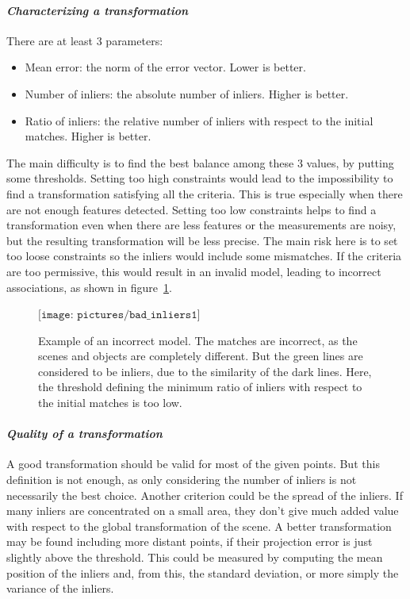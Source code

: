 \clearpage
\paragraph{\emph{Characterizing a transformation}}

There are at least 3 parameters:
\begin{itemize}
\item Mean error: the norm of the error vector. Lower is better.
\item Number of inliers: the absolute number of inliers. Higher is better.
\item Ratio of inliers: the relative number of inliers with respect to the initial matches. Higher is better.
\end{itemize}

The main difficulty is to find the best balance among these 3 values, by putting some thresholds. Setting too high constraints would lead to the impossibility to find a transformation satisfying all the criteria. This is true especially when there are not enough features detected. Setting too low constraints helps to find a transformation even when there are less features or the measurements are noisy, but the resulting transformation will be less precise. The main risk here is to set too loose constraints so the inliers would include some mismatches. If the criteria are too permissive, this would result in an invalid model, leading to incorrect associations, as shown in figure~\ref{fig:bad_inliers}. 

\begin{figure}[H]
\centering$
\texttt{[image: pictures/bad\_inliers1]}$
\caption{Example of an incorrect model. The matches are incorrect, as the scenes and objects are completely different. But the green lines are considered to be inliers, due to the similarity of the dark lines. Here, the threshold defining the minimum ratio of inliers with respect to the initial matches is too low.}
\label{fig:bad_inliers}
\end{figure}

\paragraph{\emph{Quality of a transformation}}

A good transformation should be valid for most of the given points. But this definition is not enough, as only considering the number of inliers is not necessarily the best choice. Another criterion could be the spread of the inliers. If many inliers are concentrated on a small area, they don't give much added value with respect to the global transformation of the scene. A better transformation may be found including more distant points, if their projection error is just slightly above the threshold. This could be measured by computing the mean position of the inliers and, from this, the standard deviation, or more simply the variance of the inliers.

